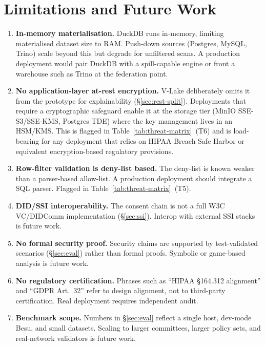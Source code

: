 \documentclass[10pt,twocolumn]{article}
\begin{document}
\section{Limitations and Future Work}
\label{sec:limitations}

\begin{enumerate}[leftmargin=*,topsep=3pt,itemsep=2pt]
\item \textbf{In-memory materialisation.}
  DuckDB runs in-memory, limiting materialised dataset size to
  RAM. Push-down sources (Postgres, MySQL, Trino) scale beyond
  this but degrade for unfiltered scans. A production deployment
  would pair DuckDB with a spill-capable engine or front a
  warehouse such as Trino at the federation point.

\item \textbf{No application-layer at-rest encryption.}
  V-Lake deliberately omits it from the prototype for
  explainability (\S\ref{sec:rest-split}). Deployments that
  require a cryptographic safeguard enable it at the storage
  tier (MinIO SSE-S3/SSE-KMS, Postgres TDE) where the key
  management lives in an HSM/KMS. This is flagged in
  Table~\ref{tab:threat-matrix}~(T6) and is load-bearing for any
  deployment that relies on HIPAA Breach Safe Harbor or
  equivalent encryption-based regulatory provisions.

\item \textbf{Row-filter validation is deny-list based.}
  The deny-list is known weaker than a parser-based allow-list. A
  production deployment should integrate a SQL parser. Flagged
  in Table~\ref{tab:threat-matrix}~(T5).

\item \textbf{DID/SSI interoperability.}
  The consent chain is not a full W3C VC/DIDComm implementation
  (\S\ref{sec:ssi}). Interop with external SSI stacks is future
  work.

\item \textbf{No formal security proof.}
  Security claims are supported by test-validated scenarios
  (\S\ref{sec:eval}) rather than formal proofs. Symbolic or
  game-based analysis is future work.

\item \textbf{No regulatory certification.}
  Phrases such as ``HIPAA \S164.312 alignment'' and ``GDPR
  Art.~32'' refer to design alignment, not to third-party
  certification. Real deployment requires independent audit.

\item \textbf{Benchmark scope.}
  Numbers in \S\ref{sec:eval} reflect a single host, dev-mode
  Besu, and small datasets. Scaling to larger committees, larger
  policy sets, and real-network validators is future work.


\end{enumerate}
\end{document}
